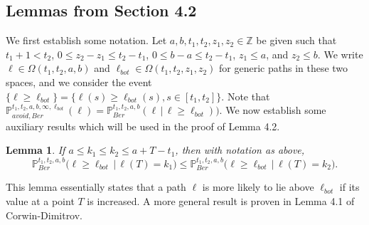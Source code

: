 \documentclass[12pt]{article}
\newtheorem{lemma}{Lemma}
\begin{document}
\subsection*{Lemmas from Section 4.2}

	
	We first establish some notation. Let $a,b,t_1,t_2,z_1,z_2 \in \mathbb{Z}$ be given such that $t_1 + 1 < t_2$, $0\leq z_2 - z_1 \leq t_2 - t_1$, $0\leq b-a \leq t_2 - t_1$, $z_1\leq a$, and $z_2\leq b$. We write $\ell\in\Omega(t_1,t_2,a,b)$ and $\ell_{bot}\in\Omega(t_1,t_2,z_1,z_2)$ for generic paths in these two spaces, and we consider the event $\{\ell \geq \ell_{bot}\} = \{\ell(s) \geq \ell_{bot}(s), s\in[t_1,t_2]\}$. Note that $\mathbb{P}^{t_1,t_2,a,b,\infty,\ell_{bot}}_{avoid,Ber}(\ell) = \mathbb{P}^{t_1,t_2,a,b}_{Ber}(\ell\,|\,\ell \geq \ell_{bot}))$. We now establish some auxiliary results which will be used in the proof of Lemma 4.2.
	
	\begin{lemma}
		If $a\leq k_1\leq k_2\leq a + T - t_1$, then with notation as above,
		\[
		\mathbb{P}^{t_1, t_2, a, b}_{Ber}\big( \ell \geq \ell_{bot}\,\big|\,\ell(T) = k_1\big) \leq \mathbb{P}^{t_1, t_2, a, b}_{Ber}\big(\ell \geq \ell_{bot}\,\big|\,\ell(T) = k_2\big).
		\]
	\end{lemma}

	\begin{remark}
		This lemma essentially states that a path $\ell$ is more likely to lie above $\ell_{bot}$ if its value at a point $T$ is increased. A more general result is proven in Lemma 4.1 of Corwin-Dimitrov.
	\end{remark}
\end{document}
